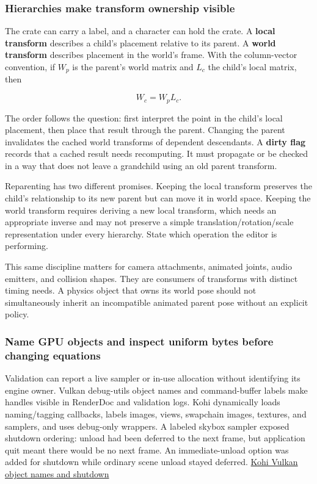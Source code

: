 \subsubsection{Hierarchies make transform ownership visible}\label{06-engine-ii-ch026-hierarchies-make-transform-ownership-visible}

The crate can carry a label, and a character can hold the crate. A \textbf{local transform} describes a child's placement relative to its parent. A \textbf{world transform} describes placement in the world's frame. With the column-vector convention, if \(W_p\) is the parent's world matrix and \(L_c\) the child's local matrix, then

\[
W_c=W_pL_c.
\]

The order follows the question: first interpret the point in the child's local placement, then place that result through the parent. Changing the parent invalidates the cached world transforms of dependent descendants. A \textbf{dirty flag} records that a cached result needs recomputing. It must propagate or be checked in a way that does not leave a grandchild using an old parent transform.

Reparenting has two different promises. Keeping the local transform preserves the child's relationship to its new parent but can move it in world space. Keeping the world transform requires deriving a new local transform, which needs an appropriate inverse and may not preserve a simple translation/rotation/scale representation under every hierarchy. State which operation the editor is performing.

This same discipline matters for camera attachments, animated joints, audio emitters, and collision shapes. They are consumers of transforms with distinct timing needs. A physics object that owns its world pose should not simultaneously inherit an incompatible animated parent pose without an explicit policy.

\subsubsection{Name GPU objects and inspect uniform bytes before changing equations}\label{06-engine-ii-ch026-name-gpu-objects-and-inspect-uniform-bytes-before-changing-equations}

Validation can report a live sampler or in-use allocation without identifying its engine owner. Vulkan debug-utils object names and command-buffer labels make handles visible in RenderDoc and validation logs. Kohi dynamically loads naming/tagging callbacks, labels images, views, swapchain images, textures, and samplers, and uses debug-only wrappers. A labeled skybox sampler exposed shutdown ordering: unload had been deferred to the next frame, but application quit meant there would be no next frame. An immediate-unload option was added for shutdown while ordinary scene unload stayed deferred. \href{https://www.youtube.com/watch?v=0ILGxLqvlsA}{Kohi Vulkan object names and shutdown}

